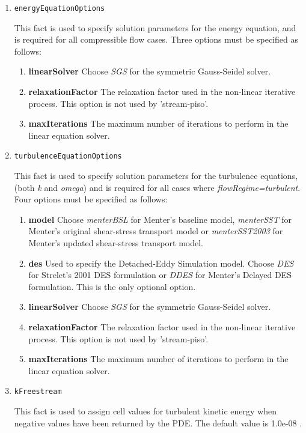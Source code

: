 \documentclass{article}
\begin{document}
\begin{enumerate}
\item{\tt energyEquationOptions}

This fact is used to specify solution parameters for the energy equation,
and is required for all compressible flow cases.  Three options must be
specified as follows:
  \begin{enumerate}
     \item{\bf linearSolver} Choose \emph{SGS} for the symmetric Gauss-Seidel
solver.
     \item{\bf relaxationFactor} The relaxation factor used in the non-linear
iterative process. This option is not used by 'stream-piso'.
     \item{\bf maxIterations} The maximum number of iterations to perform in
the linear equation solver.
  \end{enumerate}

\item{\tt turbulenceEquationOptions}

This fact is used to specify solution parameters for the turbulence equations,
(both \emph{k} and \emph{omega}) and is required for all cases where
\emph{flowRegime=turbulent}. Four options must be specified as follows:
  \begin{enumerate}
     \item{\bf model} Choose \emph{menterBSL} for Menter's baseline model,
\emph{menterSST} for Menter's original shear-stress transport model or
\emph{menterSST2003} for Menter's updated shear-stress transport model.
     \item{\bf des} Used to specify the Detached-Eddy Simulation model.
Choose \emph{DES} for Strelet's 2001 DES formulation or \emph{DDES} for
Menter's Delayed DES formulation. This is the only optional option.
     \item{\bf linearSolver} Choose \emph{SGS} for the symmetric Gauss-Seidel
solver.
     \item{\bf relaxationFactor} The relaxation factor used in the non-linear
iterative process. This option is not used by 'stream-piso'.
     \item{\bf maxIterations} The maximum number of iterations to perform in
the linear equation solver.
  \end{enumerate}

\item{\tt kFreestream}

This fact is used to assign cell values for turbulent kinetic energy when
negative values have been returned by the PDE. The default value is 1.0e-08 .


\end{enumerate}
\end{document}
